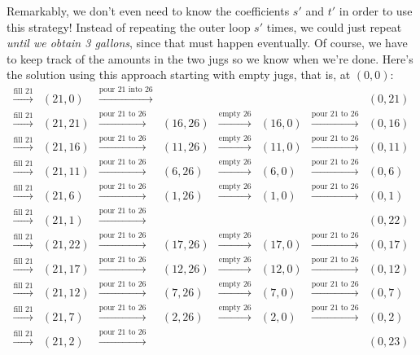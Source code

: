 Remarkably, we don't even need to know the coefficients $s'$ and $t'$ in order to use this
strategy!  Instead of repeating the outer loop $s'$ times, we could just repeat \emph{until
  we obtain 3 gallons}, since that must happen eventually.  Of course, we have to keep
track of the amounts in the two jugs so we know when we're done.  Here's the solution using this
approach starting with empty jugs, that is, at $(0,0)$:
\[
\begin{array}{cccccccc}
\xrightarrow{\text{fill 21}} & (21,0)& \xrightarrow{\text{pour 21 into  26}} & & & &&(0,21)\\
\xrightarrow{\text{fill 21}} & (21,21)& \xrightarrow{\text{pour 21 to
    26}} & (16,26)& \xrightarrow{\text{empty 26}} & (16,0)& \xrightarrow{\text{pour 21 to
    26}} & (0,16)\\
\xrightarrow{\text{fill 21}} & (21,16)& \xrightarrow{\text{pour 21 to
    26}} & (11,26)& \xrightarrow{\text{empty 26}} & (11,0)& \xrightarrow{\text{pour 21 to
    26}} & (0,11)\\
\xrightarrow{\text{fill 21}} & (21,11)& \xrightarrow{\text{pour 21 to
    26}} & (6,26)& \xrightarrow{\text{empty 26}} & (6,0)& \xrightarrow{\text{pour 21 to
    26}} & (0,6)\\
\xrightarrow{\text{fill 21}} & (21,6)& \xrightarrow{\text{pour 21 to
    26}} & (1,26)& \xrightarrow{\text{empty 26}} & (1,0)& \xrightarrow{\text{pour 21 to
    26}} & (0,1)\\
\xrightarrow{\text{fill 21}} & (21,1)& \xrightarrow{\text{pour 21 to
    26}} &&&&& (0,22)\\
\xrightarrow{\text{fill 21}} & (21,22)& \xrightarrow{\text{pour 21 to
    26}} & (17,26)& \xrightarrow{\text{empty 26}} & (17,0)& \xrightarrow{\text{pour 21 to
    26}} & (0,17)\\
\xrightarrow{\text{fill 21}} & (21,17)& \xrightarrow{\text{pour 21 to
    26}} & (12,26)& \xrightarrow{\text{empty 26}} & (12,0)& \xrightarrow{\text{pour 21 to
    26}} & (0,12)\\
\xrightarrow{\text{fill 21}} & (21,12)& \xrightarrow{\text{pour 21 to
    26}} & (7,26)& \xrightarrow{\text{empty 26}} & (7,0)& \xrightarrow{\text{pour 21 to
    26}} & (0,7)\\
\xrightarrow{\text{fill 21}} & (21,7)& \xrightarrow{\text{pour 21 to
    26}} & (2,26)& \xrightarrow{\text{empty 26}} & (2,0)& \xrightarrow{\text{pour 21 to
    26}} & (0,2)\\
\xrightarrow{\text{fill 21}} & (21,2)& \xrightarrow{\text{pour 21 to
    26}} & &&&&(0,23)\\

\end{array}\]
